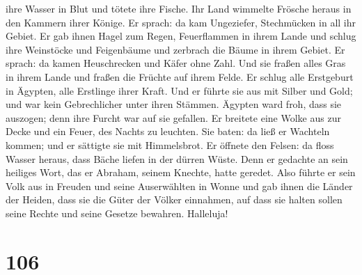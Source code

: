 ihre Wasser in Blut und tötete ihre Fische.  Ihr Land
wimmelte Frösche heraus in den Kammern ihrer Könige.  Er
sprach: da kam Ungeziefer, Stechmücken in all ihr Gebiet.
 Er gab ihnen Hagel zum Regen, Feuerflammen in ihrem
Lande  und schlug ihre Weinstöcke und Feigenbäume und
zerbrach die Bäume in ihrem Gebiet.  Er sprach: da kamen
Heuschrecken und Käfer ohne Zahl.  Und sie fraßen alles
Gras in ihrem Lande und fraßen die Früchte auf ihrem Felde.
 Er schlug alle Erstgeburt in Ägypten, alle Erstlinge
ihrer Kraft.  Und er führte sie aus mit Silber und Gold;
und war kein Gebrechlicher unter ihren Stämmen.  Ägypten
ward froh, dass sie auszogen; denn ihre Furcht war auf sie gefallen.
 Er breitete eine Wolke aus zur Decke und ein Feuer, des
Nachts zu leuchten.  Sie baten: da ließ er Wachteln
kommen; und er sättigte sie mit Himmelsbrot.  Er öffnete
den Felsen: da floss Wasser heraus, dass Bäche liefen in der dürren
Wüste.  Denn er gedachte an sein heiliges Wort, das er
Abraham, seinem Knechte, hatte geredet.  Also führte er
sein Volk aus in Freuden und seine Auserwählten in Wonne 
und gab ihnen die Länder der Heiden, dass sie die Güter der Völker
einnahmen,  auf dass sie halten sollen seine Rechte und
seine Gesetze bewahren. Halleluja!

\hypertarget{section-105}{%
\section{106}\label{section-105}}


